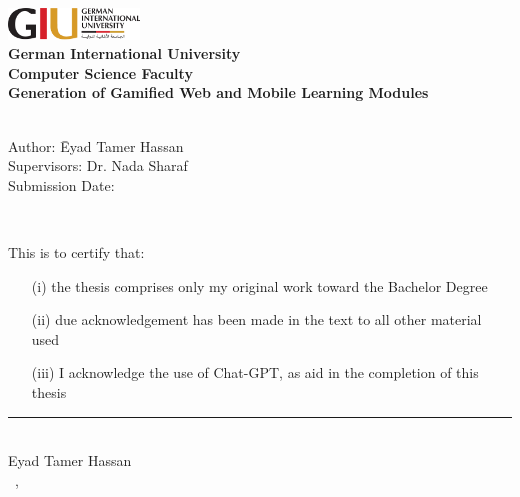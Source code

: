 \newcommand{\titlePage}{

\thispagestyle{empty}
\begin{center}
	\includegraphics[width=3.5cm]{figures/image.png}\\[2mm]
	\textbf{German International University}\\[2mm]
		\textbf{Computer Science Faculty}\\[1mm]

	
	\vspace{2cm}
	\doublespacing
	{\Huge \textbf{Generation of Gamified Web and Mobile Learning Modules}}\\
	\singlespacing
	\vspace{2cm}
	{\large \textbf{\typeOfThesis}}\\
	
	\vfill
	\parbox{1cm}{
  		\begin{large}
    			\begin{tabbing}
       			Author: \hspace{2cm}  
        			\= Eyad Tamer Hassan \\[2mm]
      			Supervisors: 
        			\> Dr. Nada Sharaf\\[2mm]
      			Submission Date: 
        			\>\submissionDate\\
    			\end{tabbing}
  		\end{large}
	}\\
\end{center}
\clearpage
}
\titlePage 
\thispagestyle{empty}
This is to certify that:
\begin{itemize}
\item[(i)] the thesis comprises only my original work toward the Bachelor Degree
\item[(ii)] due acknowledgement has been made in the text to all other material used
\item[(iii)] I acknowledge the use of Chat-GPT, as aid in the completion of this thesis
\end{itemize}

\vspace{2cm}
\begin{flushright}
\rule[0mm]{6cm}{0.2mm}\\
Eyad Tamer Hassan\\ 
\submissionDay~\submissionMonth,~\submissionYear\\
\end{flushright}
\clearpage
